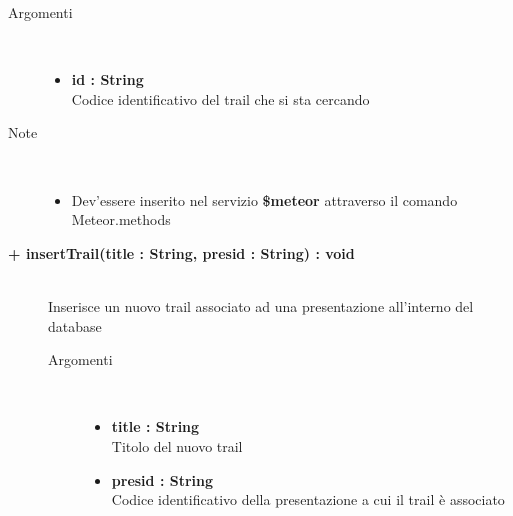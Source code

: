 \begin{description}
\begin{description}
		\begin{description}
			\item[Argomenti] \hfill \\
				\begin{itemize}
				
					\item \textbf{id : String			} \hfill \\
					Codice identificativo del trail che si sta cercando
					
				\end{itemize}
			\item[Note] \hfill \\
			\begin{itemize}
					\item Dev'essere inserito nel servizio \textbf{\$meteor} attraverso il comando Meteor.methods
				\end{itemize}
		\end{description}
	\end{description}
	
	\begin{description}
		\item[\textbf{\color{blue}+ insertTrail(title : String, presid : String) : void			}] \hfill \\
			Inserisce un nuovo trail associato ad una presentazione all'interno del database
			
		\begin{description}
			\item[Argomenti] \hfill \\
				\begin{itemize}
				
					\item \textbf{title : String			} \hfill \\
					Titolo del nuovo trail
					\item \textbf{presid : String			} \hfill \\
					Codice identificativo della presentazione a cui il trail è associato
					

\end{itemize}
\end{description}
\end{description}
\end{description}

